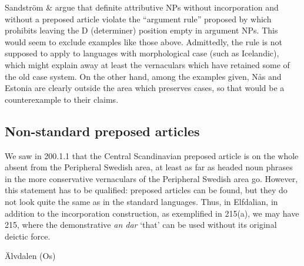 \begin{styleBodyTextFirst}
Sandström \& \citet[110]{Holmberg2003} argue that definite attributive NPs without incorporation and without a preposed article violate the “argument rule” proposed by \citet{Delsing1993} which prohibits leaving the D (determiner) position empty in argument NPs. This would seem to exclude examples like those above. Admittedly, the rule is not supposed to apply to languages with morphological case (such as Icelandic), which might explain away at least the vernaculars which have retained some of the old case system. On the other hand, among the examples given, Nås and Estonia are clearly outside the area which preserves cases, so that would be a counterexample to their claims. 

\end{styleBodyTextFirst}

\subsection{Non-standard preposed articles }
\label{bkm:Ref264372909}\label{bkm:Ref264372864}\label{bkm:Ref264372580}
\begin{styleBodyTextFirst}
We saw in 200.1.1 that the Central Scandinavian preposed article is on the whole absent from the Peripheral Swedish area, at least as far as headed noun phrases in the more conservative vernaculars of the Peripheral Swedish area go. However, this statement has to be qualified: preposed articles can be found, but they do not look quite the same as in the standard languages. Thus, in Elfdalian, in addition to the incorporation construction, as exemplified in 215(a), we may have 215, where the demonstrative \textit{an dar} ‘that’ can be used without its original deictic force.

\end{styleBodyTextFirst}

\begin{listWWNumileveli}
\item 

\begin{styleExample}
\label{bkm:Ref155154659}Älvdalen (Os)

\end{styleExample}

\end{listWWNumileveli}

\begin{listWWNumlxiiileveli}
\item 

\end{listWWNumlxiiileveli}

